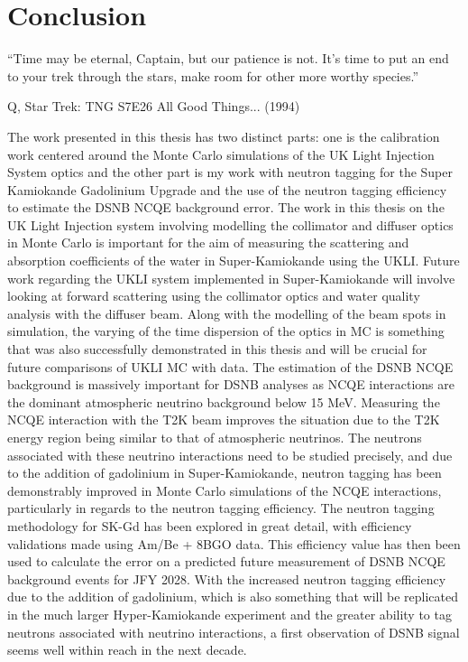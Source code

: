 \chapter{Conclusion}
\epigraph{``Time may be eternal, Captain, but our patience is not. It's time to put an end to your trek through the stars, make room for other more worthy species.''}{Q, Star Trek: TNG S7E26 All Good Things... (1994)}
\label{chp:conc}

The work presented in this thesis has two distinct parts: one is the calibration work centered around the Monte Carlo simulations of the UK Light Injection System optics and the other part is my work with neutron tagging for the Super Kamiokande Gadolinium Upgrade and the use of the neutron tagging efficiency to estimate the DSNB NCQE background error. 
\newline
The work in this thesis on the UK Light Injection system involving modelling the collimator and diffuser optics in Monte Carlo is important for the aim of measuring the scattering and absorption coefficients of the water in Super-Kamiokande using the UKLI. Future work regarding the UKLI system implemented in Super-Kamiokande will involve looking at forward scattering using the collimator optics and water quality analysis with the diffuser beam. Along with the modelling of the beam spots in simulation, the varying of the time dispersion of the optics in MC is something that was also successfully demonstrated in this thesis and will be crucial for future comparisons of UKLI MC with data.
\newline
The estimation of the DSNB NCQE background is massively important for DSNB analyses as NCQE interactions are the dominant atmospheric neutrino background below 15 MeV. Measuring the NCQE interaction with the T2K beam improves the situation due to the T2K energy region being similar to that of atmospheric neutrinos. The neutrons associated with these neutrino interactions need to be studied precisely, and due to the addition of gadolinium in Super-Kamiokande, neutron tagging has been demonstrably improved in Monte Carlo simulations of the NCQE interactions, particularly in regards to the neutron tagging efficiency. The neutron tagging methodology for SK-Gd has been explored in great detail, with efficiency validations made using Am/Be + 8BGO data. This efficiency value has then been used to calculate the error on a predicted future measurement of DSNB NCQE background events for JFY 2028. With the increased neutron tagging efficiency due to the addition of gadolinium, which is also something that will be replicated in the much larger Hyper-Kamiokande experiment and the greater ability to tag neutrons associated with neutrino interactions, a first observation of DSNB signal seems well within reach in the next decade.



